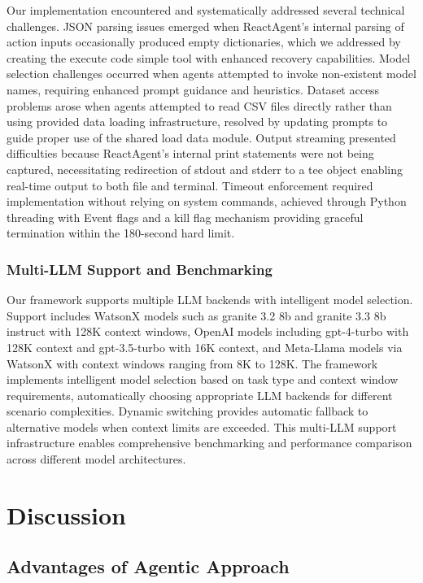\documentclass[conference]{IEEEtran}
\begin{document}
Our implementation encountered and systematically addressed several technical challenges. JSON parsing issues emerged when ReactAgent's internal parsing of action inputs occasionally produced empty dictionaries, which we addressed by creating the execute code simple tool with enhanced recovery capabilities. Model selection challenges occurred when agents attempted to invoke non-existent model names, requiring enhanced prompt guidance and heuristics. Dataset access problems arose when agents attempted to read CSV files directly rather than using provided data loading infrastructure, resolved by updating prompts to guide proper use of the shared load data module. Output streaming presented difficulties because ReactAgent's internal print statements were not being captured, necessitating redirection of stdout and stderr to a tee object enabling real-time output to both file and terminal. Timeout enforcement required implementation without relying on system commands, achieved through Python threading with Event flags and a kill flag mechanism providing graceful termination within the 180-second hard limit.

\subsubsection{Multi-LLM Support and Benchmarking}

Our framework supports multiple LLM backends with intelligent model selection. Support includes WatsonX models such as granite 3.2 8b and granite 3.3 8b instruct with 128K context windows, OpenAI models including gpt-4-turbo with 128K context and gpt-3.5-turbo with 16K context, and Meta-Llama models via WatsonX with context windows ranging from 8K to 128K. The framework implements intelligent model selection based on task type and context window requirements, automatically choosing appropriate LLM backends for different scenario complexities. Dynamic switching provides automatic fallback to alternative models when context limits are exceeded. This multi-LLM support infrastructure enables comprehensive benchmarking and performance comparison across different model architectures.

\section{Discussion}

\subsection{Advantages of Agentic Approach}
\end{document}
